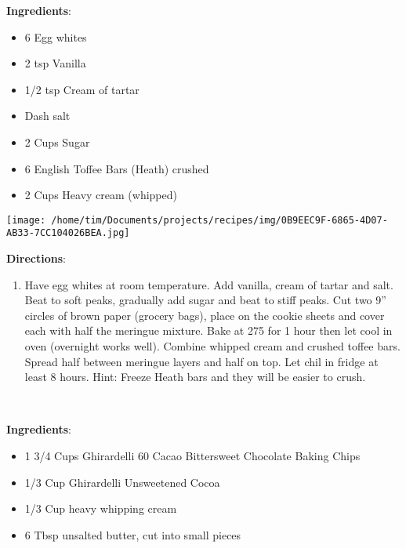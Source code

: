 \documentclass[11pt, twoside, openany]{book}
\begin{document}
\begin{minipage}[t]{0.8\linewidth}
\textbf{Ingredients}:\vspace{-3mm}
\begin{multicols}{2}
\begin{itemize}\setlength\itemsep{-1mm}
\item 6 Egg whites
\item 2 tsp Vanilla
\item 1/2 tsp Cream of tartar
\item Dash salt
\item 2 Cups Sugar
\item 6 English Toffee Bars (Heath) crushed
\item 2 Cups Heavy cream (whipped)
\end{itemize}
\end{multicols}
\end{minipage}
\begin{minipage}[t]{0.2\linewidth}
\centering \strut\vspace*{-\baselineskip}\newline
\texttt{[image: /home/tim/Documents/projects/recipes/img/0B9EEC9F-6865-4D07-AB33-7CC104026BEA.jpg]}\\
\end{minipage}\vspace{3mm}
\textbf{Directions}:
\vspace{-3mm}\begin{enumerate}\setlength\itemsep{-1mm}
\item Have egg whites at room temperature. Add vanilla, cream of tartar and salt. Beat to soft peaks, gradually add sugar and beat to stiff peaks. Cut two 9'' circles of brown paper (grocery bags), place on the cookie sheets and cover each with half the meringue mixture. Bake at 275 for 1 hour then let cool in oven (overnight works well). Combine whipped cream and crushed toffee bars. Spread half between meringue layers and half on top. Let chil in fridge at least 8 hours. Hint: Freeze Heath bars and they will be easier to crush.
\end{enumerate}
 \label{dark-chocolate-truffles}\hfill\textit{}\\
\begin{minipage}[t]{0.8\linewidth}
\textbf{Ingredients}:\vspace{-3mm}
\begin{multicols}{2}
\begin{itemize}\setlength\itemsep{-1mm}
\item 1 3/4 Cups Ghirardelli 60 Cacao Bittersweet Chocolate Baking Chips
\item 1/3 Cup Ghirardelli Unsweetened Cocoa
\item 1/3 Cup heavy whipping cream
\item 6 Tbsp unsalted butter, cut into small pieces
\end{itemize}
\end{multicols}
\end{minipage}
\end{document}
